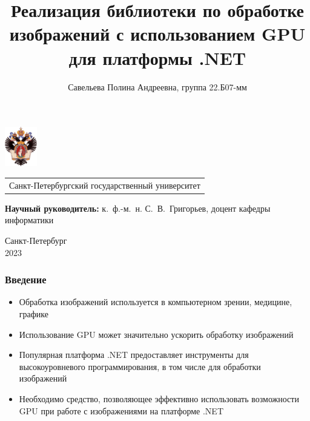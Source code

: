 \documentclass[aspectratio=169]{beamer}
\title[GPU Image Processing]{Реализация библиотеки по обработке изображений с использованием GPU для платформы .NET}
\institute[СПбГУ]{}
\author[Савельева Полина]{Савельева Полина Андреевна, группа 22.Б07-мм}
\begin{document}
{
\begin{frame}
  \includegraphics[width=1.4cm]{pictures/SPbGU_Logo.png}
\vspace{-35pt}
\hspace{-10pt}
\begin{center}
   \begin{tabular}{c}
        \scriptsize{Санкт-Петербургский государственный университет} \\
    \end{tabular}
\titlepage
\end{center}

\btVFill

{\scriptsize
   \textbf{Научный руководитель:} к.~ф.-м.~н. С.~В.~Григорьев, доцент кафедры информатики \\
 }
\begin{center}
  \vspace{5pt}
  \scriptsize{Санкт-Петербург\\
                 2023}
  \end{center}

\end{frame}
}

\begin{frame}[fragile]  
  \frametitle{Введение}
  \begin{itemize}
    \item Обработка изображений используется в компьютерном зрении, медицине, графике
    \item Использование GPU может значительно ускорить обработку изображений
    \item Популярная платформа .NET предоставляет инструменты для высокоуровневого программирования, в том числе для обработки изображений 
    \item Необходимо средство, позволяющее эффективно использовать возможности GPU при работе с изображениями на платформе .NET
  \end{itemize}
\end{frame}
            
\end{document}
